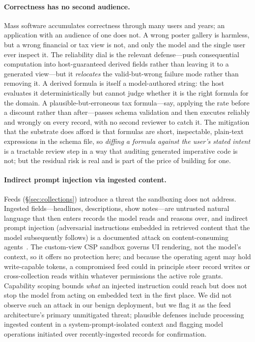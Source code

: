 \documentclass[11pt]{article}
\begin{document}
\paragraph{Correctness has no second audience.}
Mass software accumulates correctness through many users and years; an application
with an audience of one does not. A wrong poster gallery is harmless, but a wrong
financial or tax view is not, and only the model and the single user ever inspect
it. The reliability dial is the relevant defense---push consequential computation
into host-guaranteed derived fields rather than leaving it to a generated
view---but it \emph{relocates} the valid-but-wrong failure mode rather than
removing it. A derived formula is itself a model-authored string: the host
evaluates it deterministically but cannot judge whether it is the right formula for
the domain. A plausible-but-erroneous tax formula---say, applying the rate before a
discount rather than after---passes schema validation and then executes reliably
and wrongly on every record, with no second reviewer to catch it. The mitigation
that the substrate does afford is that formulas are short, inspectable, plain-text
expressions in the schema file, so \emph{diffing a formula against the user's
stated intent} is a tractable review step in a way that auditing generated
imperative code is not; but the residual risk is real and is part of the price of
building for one.

\paragraph{Indirect prompt injection via ingested content.}
Feeds (\S\ref{sec:collections}) introduce a threat the sandboxing does not address.
Ingested fields---headlines, descriptions, show notes---are untrusted natural
language that then enters records the model reads and reasons over, and indirect
prompt injection (adversarial instructions embedded in retrieved content that the
model subsequently follows) is a documented attack on content-consuming
agents~\citep{greshake2023injection}. The custom-view CSP sandbox governs UI
rendering, not the model's context, so it offers no protection here; and because
the operating agent may hold write-capable tokens, a compromised feed could in
principle steer record writes or cross-collection reads within whatever permissions
the active role grants. Capability scoping bounds \emph{what} an injected
instruction could reach but does not stop the model from acting on embedded text in
the first place. We did not observe such an attack in our benign deployment, but we
flag it as the feed architecture's primary unmitigated threat; plausible defenses
include processing ingested content in a system-prompt-isolated context and
flagging model operations initiated over recently-ingested records for confirmation.
\end{document}
